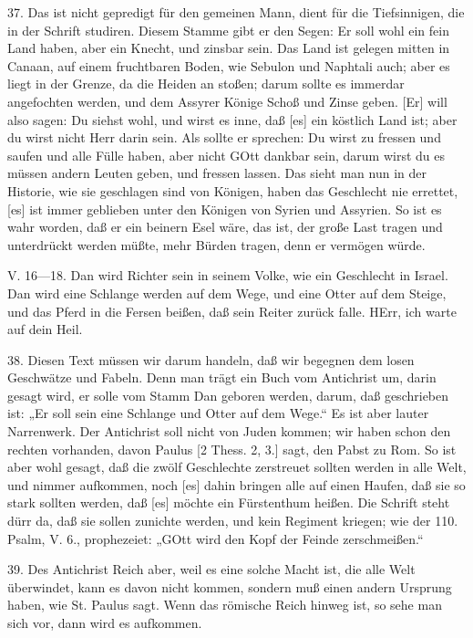 37. Das ist nicht gepredigt für den gemeinen Mann, dient für die Tiefsinnigen, die in der Schrift studiren. Diesem Stamme gibt er den Segen: Er soll wohl ein fein Land haben, aber ein Knecht, und zinsbar sein. Das Land ist gelegen mitten in Canaan, auf einem fruchtbaren Boden, wie Sebulon und Naphtali auch; aber es liegt in der Grenze, da die Heiden an stoßen; darum sollte es immerdar angefochten werden, und dem Assyrer Könige Schoß und Zinse geben. [Er] will also sagen: Du siehst wohl, und wirst es inne, daß [es] ein köstlich Land ist; aber du wirst nicht Herr darin sein. Als sollte er sprechen: Du wirst zu fressen und saufen und alle Fülle haben, aber nicht GOtt dankbar sein, darum wirst du es müssen andern Leuten geben, und fressen lassen. Das sieht man nun in der Historie, wie sie geschlagen sind von Königen, haben das Geschlecht nie errettet, [es] ist immer geblieben unter den Königen von Syrien und Assyrien. So ist es wahr worden, daß er ein beinern Esel wäre, das ist, der große Last tragen und unterdrückt werden müßte, mehr Bürden tragen, denn er vermögen würde.

\begin{schriftzitat}
V. 16—18. Dan wird Richter sein in seinem Volke, wie ein Geschlecht in Israel. Dan wird eine Schlange werden auf dem Wege, und eine Otter auf dem Steige, und das Pferd in die Fersen beißen, daß sein Reiter zurück falle. HErr, ich warte auf dein Heil.
\end{schriftzitat}

38. Diesen Text müssen wir darum handeln, daß wir begegnen dem losen Geschwätze und Fabeln. Denn man trägt ein Buch vom Antichrist um, darin gesagt wird, er solle vom Stamm Dan geboren werden, darum, daß geschrieben ist: „Er soll sein eine Schlange und Otter auf dem Wege.“ Es ist aber lauter Narrenwerk. Der Antichrist soll nicht von Juden kommen; wir haben schon den rechten vorhanden, davon Paulus [2 Thess. 2, 3.] sagt, den Pabst zu Rom. So ist aber wohl gesagt, daß die zwölf Geschlechte zerstreuet sollten werden in alle Welt, und nimmer aufkommen, noch [es] dahin bringen alle auf einen Haufen, daß sie so stark sollten werden, daß [es] möchte ein Fürstenthum heißen. Die Schrift steht dürr da, daß sie sollen zunichte werden, und kein Regiment kriegen; wie der 110. Psalm, V. 6., prophezeiet: „GOtt wird den Kopf der Feinde zerschmeißen.“

39. Des Antichrist Reich aber, weil es eine solche Macht ist, die alle Welt überwindet, kann es davon nicht kommen, sondern muß einen andern Ursprung haben, wie St. Paulus sagt. Wenn das römische Reich hinweg ist, so sehe man sich vor, dann wird es aufkommen.

